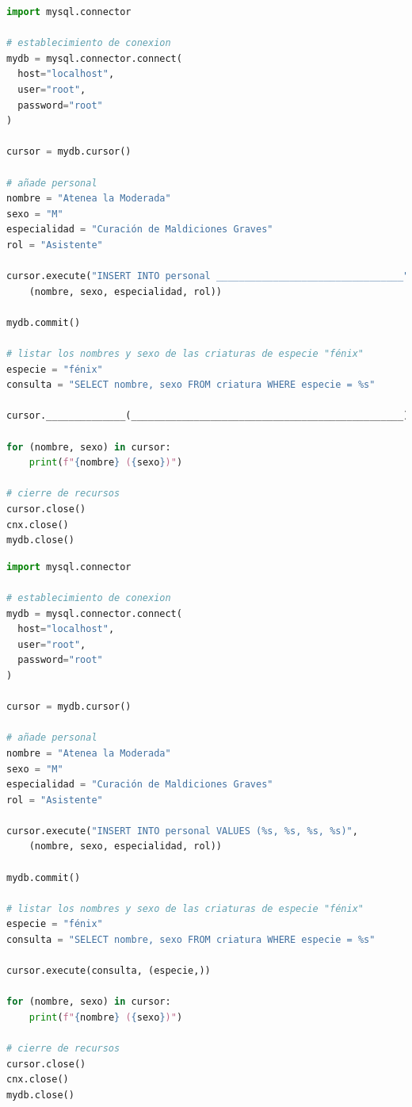 \documentclass[
    12pt,
    a4paper,
    addpoints,
    answers,
    convocatoria=ord,
    titulacion=CD,
    curso=2023/2024,
]{db-exam}
\begin{document}
\begin{questions}
\begin{parts}
\begin{lstlisting}[language=python]
import mysql.connector

# establecimiento de conexion
mydb = mysql.connector.connect(
  host="localhost",
  user="root",
  password="root"
)

cursor = mydb.cursor()

# añade personal
nombre = "Atenea la Moderada"
sexo = "M"
especialidad = "Curación de Maldiciones Graves"
rol = "Asistente"

cursor.execute("INSERT INTO personal _________________________________",
    (nombre, sexo, especialidad, rol))

mydb.commit()

# listar los nombres y sexo de las criaturas de especie "fénix"
especie = "fénix"
consulta = "SELECT nombre, sexo FROM criatura WHERE especie = %s"

cursor.______________(________________________________________________)

for (nombre, sexo) in cursor:
    print(f"{nombre} ({sexo})")

# cierre de recursos
cursor.close()
cnx.close()
mydb.close()

\end{lstlisting}

\begin{solution}[1em]
\begin{lstlisting}[language=python]
import mysql.connector

# establecimiento de conexion
mydb = mysql.connector.connect(
  host="localhost",
  user="root",
  password="root"
)

cursor = mydb.cursor()

# añade personal
nombre = "Atenea la Moderada"
sexo = "M"
especialidad = "Curación de Maldiciones Graves"
rol = "Asistente"

cursor.execute("INSERT INTO personal VALUES (%s, %s, %s, %s)",
    (nombre, sexo, especialidad, rol))

mydb.commit()

# listar los nombres y sexo de las criaturas de especie "fénix"
especie = "fénix"
consulta = "SELECT nombre, sexo FROM criatura WHERE especie = %s"

cursor.execute(consulta, (especie,))

for (nombre, sexo) in cursor:
    print(f"{nombre} ({sexo})")

# cierre de recursos
cursor.close()
cnx.close()
mydb.close()
\end{lstlisting}
\end{solution}


\end{parts}
\end{questions}
\end{document}
